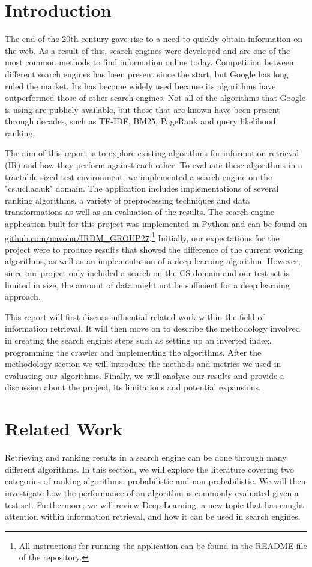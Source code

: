 \section{Introduction}

The end of the 20th century gave rise to a need to quickly obtain information on the web. As a result of this, search engines were developed and are one of the most common methods to find information online today. Competition between different search engines has been present since the start, but Google has long ruled the market. Its has become widely used because its algorithms have outperformed those of other search engines. Not all of the algorithms that Google is using are publicly available, but those that are known have been present through decades, such as TF-IDF, BM25, PageRank and query likelihood ranking.

The aim of this report is to explore existing algorithms for information retrieval (IR) and how they perform against each other. To evaluate these algorithms in a tractable sized test environment, we implemented a search engine on the "cs.ucl.ac.uk" domain. The application includes implementations of several ranking algorithms, a variety of preprocessing techniques and data transformations as well as an evaluation of the results. The search engine application built for this project was implemented in Python and can be found on \url{github.com/navohu/IRDM_GROUP27}.\footnote{All instructions for running the application can be found in the README file of the repository.} Initially, our expectations for the project were to produce results that showed the difference of the current working algorithms, as well as an implementation of a deep learning algorithm. However, since our project only included a search on the CS domain and our test set is limited in size, the amount of data might not be sufficient for a deep learning approach.

This report will first discuss influential related work within the field of information retrieval. It will then move on to describe the methodology involved in creating the search engine: steps such as setting up an inverted index, programming the crawler and implementing the algorithms. After the methodology section we will introduce the methods and metrics we used in evaluating our algorithms. Finally, we will analyse our results and provide a discussion about the project, its limitations and potential expansions.


\section{Related Work}
Retrieving and ranking results in a search engine can be done through many different algorithms. In this section, we will explore the literature covering two categories of ranking algorithms: probabilistic and non-probabilistic. We will then investigate how the performance of an algorithm is commonly evaluated given a test set. Furthermore, we will review Deep Learning, a new topic that has caught attention within information retrieval, and how it can be used in search engines.


